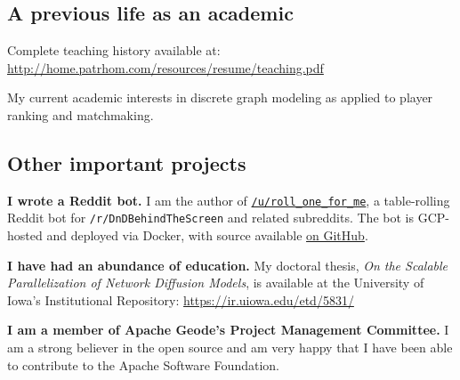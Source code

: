 \documentclass[10pt,letterpaper]{article}
\newcommand\ttt\texttt
\renewenvironment{itemize}{
  \begin{list}{}{
    \setlength{\leftmargin}{1.5em}
    \setlength{\itemsep}{0.25em}
    \setlength{\parskip}{0pt}
    \setlength{\parsep}{0.25em}
  }
}{
  \end{list}
}
\begin{document}
\subsection*{A previous life as an academic}
\begin{itemize}
  \item

  \item

  \item

  \item

  \item Complete teaching history available at: \url{http://home.patrhom.com/resources/resume/teaching.pdf}
  
  \item My current academic interests in discrete graph modeling as applied to player ranking and matchmaking.
\end{itemize}

\subsection*{Other important projects}
\begin{itemize}
  \item \textbf{I wrote a Reddit bot.} I am the author of \href{https://www.reddit.com/user/roll_one_for_me}{\ttt{/u/roll\_one\_for\_me}},
    a table-rolling Reddit bot for \ttt{/r/DnDBehindTheScreen} and related subreddits.
    The bot is GCP-hosted and deployed via Docker, with source available \href{https://github.com/PurelyApplied/roll_one_for_me/}{on GitHub}.

  \item \textbf{I have had an abundance of education.} My doctoral thesis, {\em On the Scalable Parallelization of Network Diffusion Models},
    is available at the University of Iowa's Institutional Repository:  \url{https://ir.uiowa.edu/etd/5831/}
    
 \item \textbf{I am a member of Apache Geode's Project Management Committee.}
   I am a strong believer in the open source and am very happy that I have been able to contribute to the Apache Software Foundation.
  
\end{itemize}
\end{document}

